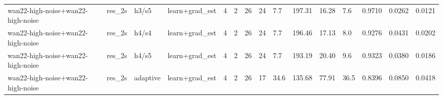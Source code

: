 \begin{tabular}{llllllrrlllllll}
wan22-high-noise+wan22-high-noise & res_2s & h3/s5 & learn+grad_est & 4 & 2 & 26 & 24 & 7.7 & 197.31 & 16.28 & 7.6 & 0.9710 & 0.0262 & 0.0121 \\
wan22-high-noise+wan22-high-noise & res_2s & h4/s4 & learn+grad_est & 4 & 2 & 26 & 24 & 7.7 & 196.46 & 17.13 & 8.0 & 0.9276 & 0.0431 & 0.0202 \\
wan22-high-noise+wan22-high-noise & res_2s & h4/s5 & learn+grad_est & 4 & 2 & 26 & 24 & 7.7 & 193.19 & 20.40 & 9.6 & 0.9323 & 0.0380 & 0.0186 \\
wan22-high-noise+wan22-high-noise & res_2s & adaptive & learn+grad_est & 4 & 2 & 26 & 17 & 34.6 & 135.68 & 77.91 & 36.5 & 0.8396 & 0.0850 & 0.0418 \\
\bottomrule
\end{tabular}
